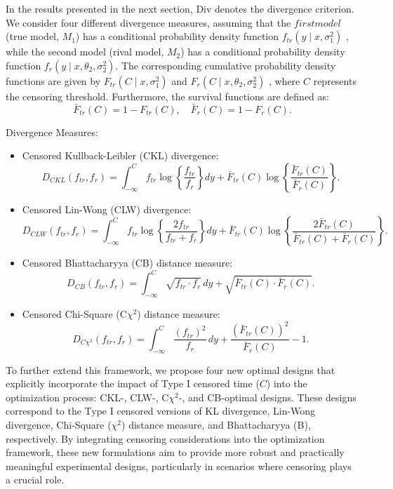 \hspace*{8mm} In the results presented in the next section, $\text{Div}$ denotes the divergence criterion. We consider four different divergence measures, assuming that the $first model$ (true model, $M_1$) has a conditional probability density function $f_{tr}(y \mid x, \sigma^2_1)$ , while the second model (rival model, $M_2$) has a conditional probability density function $f_r(y \mid x, \theta_2, \sigma^2_2)$. The corresponding cumulative probability density functions are given by $F_{tr}(C \mid x, \sigma^2_1)$ and $F_r(C \mid x, \theta_2, \sigma^2_2)$ , where $C$ represents the censoring threshold. Furthermore, the survival functions are defined as:
$$
\bar{F}_{tr}(C) = 1 - F_{tr}(C), \quad \bar{F}_r(C) = 1 - F_r(C).
$$

Divergence Measures:
\begin{itemize}
\item Censored Kullback-Leibler (CKL) divergence:
\begin{equation}\label{eq:CKL distance measure}
D_{CKL}(f_{tr}, f_r) = \int_{-\infty}^C f_{tr} \log \left\{ \frac{f_{tr}}{f_r} \right\} dy + \bar{F}_{tr}(C) \log \left\{ \frac{\bar{F}_{tr}(C)}{\bar{F}_r(C)} \right\}.
\end{equation}
\item Censored Lin-Wong (CLW) divergence:
\begin{equation}\label{eq:CLW distance measure}
D_{CLW}(f_{tr}, f_r) = \int_{-\infty}^C f_{tr} \log \left\{ \frac{2f_{tr}}{f_{tr} + f_r} \right\} dy + \bar{F}_{tr}(C) \log \left\{ \frac{2\bar{F}_{tr}(C)}{ \bar{F}_{tr}(C) + \bar{F}_r(C)} \right\}.
\end{equation}
\item Censored Bhattacharyya (CB) distance measure:
\begin{equation}\label{eq:CB distance measure}
D_{CB}(f_{tr}, f_r) = \int_{-\infty}^C \sqrt{f_{tr} \cdot f_r} \, dy + \sqrt{\bar{F}_{tr}(C) \cdot \bar{F}_r(C)}.
\end{equation}
\item Censored Chi-Square (C$\chi^2$) distance measure:
\begin{equation}\label{eq:Cchi2 distance measure}
D_{C\chi^2}(f_{tr}, f_r) = \int_{-\infty}^C \frac{(f_{tr})^2}{f_r} \, dy + \frac{\left(\bar{F}_{tr}(C)\right)^2}{\bar{F}_r(C)} - 1.
\end{equation}
\end{itemize}

\hspace*{8mm} To further extend this framework, we propose four new optimal designs that explicitly incorporate the impact of Type I censored time ($C$) into the optimization process: CKL-, CLW-, C$\chi^2$-, and CB-optimal designs. These designs correspond to the Type I censored versions of KL divergence, Lin-Wong divergence, Chi-Square ($\chi^2$) distance measure, and Bhattacharyya (B), respectively. By integrating censoring considerations into the optimization framework, these new formulations aim to provide more robust and practically meaningful experimental designs, particularly in scenarios where censoring plays a crucial role.

